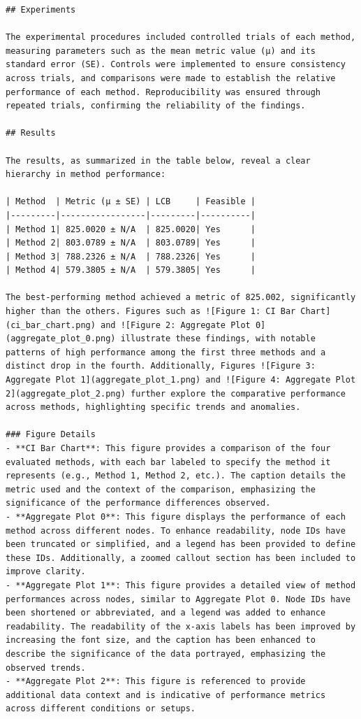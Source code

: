 \documentclass{article}
\begin{document}
\begin{verbatim}
## Experiments

The experimental procedures included controlled trials of each method, measuring parameters such as the mean metric value (μ) and its standard error (SE). Controls were implemented to ensure consistency across trials, and comparisons were made to establish the relative performance of each method. Reproducibility was ensured through repeated trials, confirming the reliability of the findings.

## Results

The results, as summarized in the table below, reveal a clear hierarchy in method performance:

| Method  | Metric (μ ± SE) | LCB     | Feasible |
|---------|-----------------|---------|----------|
| Method 1| 825.0020 ± N/A  | 825.0020| Yes      |
| Method 2| 803.0789 ± N/A  | 803.0789| Yes      |
| Method 3| 788.2326 ± N/A  | 788.2326| Yes      |
| Method 4| 579.3805 ± N/A  | 579.3805| Yes      |

The best-performing method achieved a metric of 825.002, significantly higher than the others. Figures such as ![Figure 1: CI Bar Chart](ci_bar_chart.png) and ![Figure 2: Aggregate Plot 0](aggregate_plot_0.png) illustrate these findings, with notable patterns of high performance among the first three methods and a distinct drop in the fourth. Additionally, Figures ![Figure 3: Aggregate Plot 1](aggregate_plot_1.png) and ![Figure 4: Aggregate Plot 2](aggregate_plot_2.png) further explore the comparative performance across methods, highlighting specific trends and anomalies.

### Figure Details
- **CI Bar Chart**: This figure provides a comparison of the four evaluated methods, with each bar labeled to specify the method it represents (e.g., Method 1, Method 2, etc.). The caption details the metric used and the context of the comparison, emphasizing the significance of the performance differences observed.
- **Aggregate Plot 0**: This figure displays the performance of each method across different nodes. To enhance readability, node IDs have been truncated or simplified, and a legend has been provided to define these IDs. Additionally, a zoomed callout section has been included to improve clarity.
- **Aggregate Plot 1**: This figure provides a detailed view of method performances across nodes, similar to Aggregate Plot 0. Node IDs have been shortened or abbreviated, and a legend was added to enhance readability. The readability of the x-axis labels has been improved by increasing the font size, and the caption has been enhanced to describe the significance of the data portrayed, emphasizing the observed trends.
- **Aggregate Plot 2**: This figure is referenced to provide additional data context and is indicative of performance metrics across different conditions or setups.


\end{verbatim}
\end{document}
